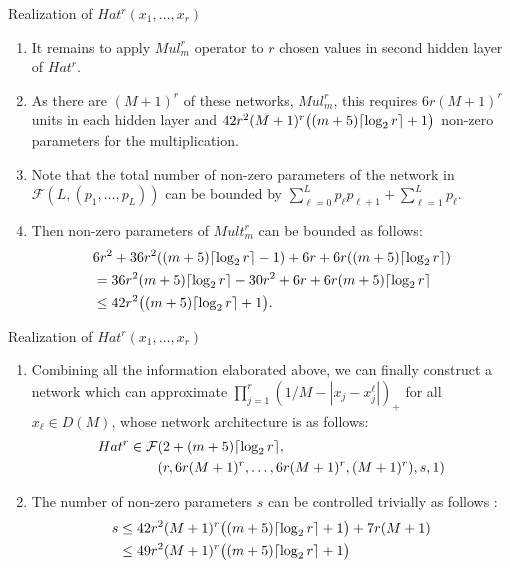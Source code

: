 \documentclass{if-beamer}
\DeclarePairedDelimiter{\ceil}{\lceil}{\rceil}
\begin{document}
\begin{frame}{Realization of $Hat^{r}(x_{1},\dots,x_{r})$}

\begin{enumerate}
    \item It remains to apply $Mul_m^{r}$ operator to $r$ chosen values in second hidden layer of $Hat^{r}$.
    
    \item As there are $(M+1)^{r}$ of these networks, $Mul_m^{r}$, this requires $6r(M+1)^{r}$ units in each hidden layer and $42r^{2}(M+1)^{r}\big((m+5)\ceil{\log_{2}r}+1\big)$ non-zero parameters for the multiplication. 
    
    \item Note that the total number of non-zero parameters of the network in $\mathcal{F}(L,(p_{1},\dots,p_{L}))$ can be bounded by $\sum_{\ell=0}^{L}p_{\ell}p_{\ell+1}+\sum_{\ell=1}^{L}p_{\ell}$.

    \item Then non-zero parameters of $Mult_m^{r}$ can be bounded as follows:
    \begin{align*}
        &6r^{2}+36r^{2}((m+5)\ceil{\log_{2}r}-1)+6r+6r((m+5)\ceil{\log_{2}r})\\
        &=36r^{2}(m+5)\ceil{\log_{2}r}-30r^{2}+6r+6r(m+5)\ceil{\log_{2}r}\\
        &\leq 42r^{2}\big((m+5)\ceil{\log_{2}r}+1\big).
    \end{align*}
\end{enumerate}
\end{frame}

\begin{frame}{Realization of $Hat^{r}(x_{1},\dots,x_{r})$}
 \begin{enumerate}
     \item  Combining all the information elaborated above, we can finally construct a network which can approximate $\prod_{j=1}^{r}(1/M - |x_{j}-x_{j}^{\ell}|)_{+}$ for all $x_{\ell}\in D(M)$, whose network architecture is as follows:
    \begin{align*}
        Hat^{r} \in \mathcal{F}&(2+(m+5) \ceil{\log_{2}r},\\
            &(r,6r(M+1)^{r},\dots,6r(M+1)^{r},(M+1)^{r}),s,1)
    \end{align*}
    \item The number of non-zero parameters $s$ can be controlled trivially as follows : 
    \begin{align*}
        s&\leq 42r^{2}(M+1)^{r}\big((m+5)\ceil{\log_{2}r}+1\big) + 7r(M+1)\\
        &\leq 49r^{2}(M+1)^{r}\big((m+5)\ceil{\log_{2}r}+1\big)
    \end{align*}
\end{enumerate}
\end{frame}
\end{document}
